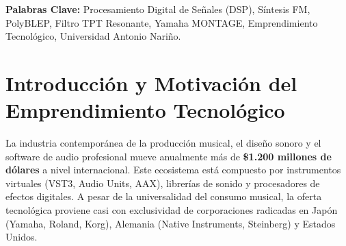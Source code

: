 \documentclass[11pt,a4paper]{article}
\begin{document}
\newpage
\begin{abstract}
\noindent Este informe presenta el diseño, modelado matemático, implementación computacional y plan de comercialización de \textbf{Aurora By Juan Esteban Vera} (v2.1.0), una estación de síntesis digital de señales (DSP) híbrida en tiempo real inspirada en la arquitectura del sintetizador insignia \textbf{Yamaha MONTAGE}, así como en los clásicos legendarios \textbf{Yamaha DX7} y \textbf{Yamaha CS-80}. El sistema integra osciladores con banda limitada anti-aliasing mediante corrección polinomial \textit{PolyBLEP}, un motor de síntesis por Modulación de Frecuencia (FM-X), un filtro resonante analógico de 2 polos basado en la transformada preservadora de topología (\textit{TPT State-Variable Filter}), saturación armónica suave ($\tanh$), línea de retardo estéreo analógica (\textit{Ping-Pong Delay}), reverberación espacial de Schroeder y un procesador vocal con seguimiento de tono en tiempo real basado en el teorema de Wiener-Khinchin. La arquitectura de software optimizada en vectores NumPy SIMD garantiza latencias inferiores a $5.33\text{ ms}$ y consumo de CPU inferior al $2.8\%$. Se formula además la hoja de ruta estratégica para la creación de una empresa tecnológica (\textit{Spin-off}) enfocada en la venta de licencias de software y propiedad intelectual de audio desde Ibagué, Colombia.
\end{abstract}

\vspace{0.5cm}
\noindent \textbf{Palabras Clave:} Procesamiento Digital de Señales (DSP), Síntesis FM, PolyBLEP, Filtro TPT Resonante, Yamaha MONTAGE, Emprendimiento Tecnológico, Universidad Antonio Nariño.

\vspace{1.0cm}
\tableofcontents
\newpage

\section{Introducción y Motivación del Emprendimiento Tecnológico}

La industria contemporánea de la producción musical, el diseño sonoro y el software de audio profesional mueve anualmente más de \textbf{\$1.200 millones de dólares} a nivel internacional. Este ecosistema está compuesto por instrumentos virtuales (VST3, Audio Units, AAX), librerías de sonido y procesadores de efectos digitales. A pesar de la universalidad del consumo musical, la oferta tecnológica proviene casi con exclusividad de corporaciones radicadas en Japón (Yamaha, Roland, Korg), Alemania (Native Instruments, Steinberg) y Estados Unidos.
\end{document}
